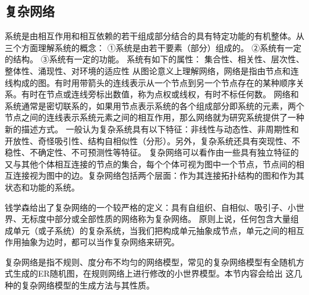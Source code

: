 \subsection{复杂网络}
系统是由相互作用和相互依赖的若干组成部分结合的具有特定功能的有机整体。从三个方面理解系统的概念：
     ①系统是由若干要素（部分）组成的。
     ②系统有一定的结构。
     ③系统有一定的功能。
     系统有如下的属性：
     集合性、相关性、层次性、整体性、涌现性、对环境的适应性
从图论意义上理解网络，网络是指由节点和连线构成的图。有时用带箭头的连线表示从一个节点到另一个节点存在的某种顺序关系。有时在节点或连线旁标出数值，称为点权或线权，有时不标任何数。
网络和系统通常是密切联系的，如果用节点表示系统的各个组成部分即系统的元素，两个节点之间的连线表示系统元素之间的相互作用，那么网络就为研究系统提供了一种新的描述方式。
一般认为复杂系统具有以下特征：非线性与动态性、非周期性和开放性、奇怪吸引性、结构自相似性（分形）。另外，复杂系统还具有突现性、不稳性、不确定性、不可预测性等特征。
复杂网络可以看作由一些具有独立特征的又与其他个体相互连接的节点的集合，每个个体可视为图中一个节点，节点间的相互连接视为图中的边。复杂网络包括两个层面：作为其连接拓扑结构的图和作为其状态和功能的系统。
\par 钱学森给出了复杂网络的一个较严格的定义：具有自组织、自相似、吸引子、小世界、无标度中部分或全部性质的网络称为复杂网络。
原则上说，任何包含大量组成单元（或子系统）的复杂系统，当我们把构成单元抽象成节点，单元之间的相互作用抽象为边时，都可以当作复杂网络来研究。

复杂网络是指不规则、度分布不均匀的网络模型，常见的复杂网络模型有全随机方式生成的ER随机图，在规则网络上进行修改的小世界模型。本节内容会给出
这几种的复杂网络模型的生成方法与其性质。
